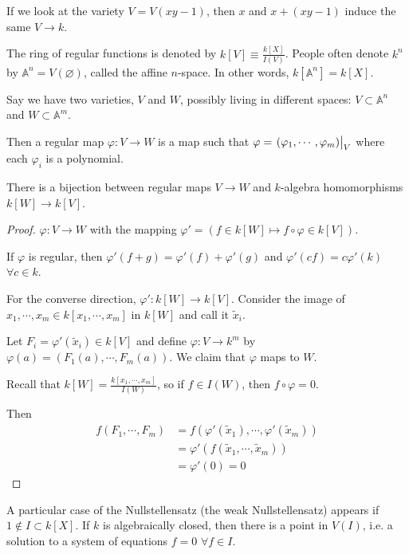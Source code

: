 \documentclass[a4paper,twoside,master.tex]{subfiles}
\begin{document}
If we look at the variety $ V = V(xy-1) $, then $ x $ and $ x + (xy - 1) $ induce the same $ V \to k $.

The ring of regular functions is denoted by $ k[V] \equiv \frac{k[X]}{I(V)} $. People often denote $ k^n $ by $ \mathbb{A}^n = V(\varnothing) $, called the affine $ n $-space. In other words, $ k[\mathbb{A}^n] = k[X] $.

Say we have two varieties, $ V $ and $ W $, possibly living in different spaces: $ V \subset \mathbb{A}^n $ and $ W \subset \mathbb{A}^m $.

Then a regular map $ \varphi \colon V \to W $ is a map such that $ \varphi = \eval{(\varphi_1, \cdots, \varphi_m)}_{V} $ where each $ \varphi_i $ is a polynomial.

\begin{claim}
    There is a bijection between regular maps $ V \to W $ and $ k $-algebra homomorphisms $ k[W] \to k[V] $.
\end{claim}
\begin{proof}
    $ \varphi \colon V \to W $ with the mapping $ \varphi' = (f \in k[W] \mapsto f \circ \varphi \in k[V]) $.
    
    If $ \varphi $ is regular, then $ \varphi'(f+g) = \varphi'(f) + \varphi'(g) $ and $ \varphi'(cf) = c \varphi'(k) $ $ \forall c \in k $.

    For the converse direction, $ \varphi' \colon k[W] \to k[V] $. Consider the image of $ x_1, \cdots, x_m \in k[x_1, \cdots, x_m] $ in $ k[W] $ and call it $ \tilde{x}_i $.

    Let $ F_i = \varphi'(\tilde{x}_i) \in k[V] $ and define $ \varphi \colon V \to k^m $ by $ \varphi(a) = (F_1(a), \cdots, F_m(a)) $. We claim that $ \varphi $ maps to $ W $. 

    Recall that $ k[W] = \frac{k[x_1, \cdots, x_m]}{I(W)} $, so if $ f \in I(W) $, then $ f \circ \varphi = 0 $.

    Then
    \begin{align}
        f(F_1, \cdots, F_m) &= f(\varphi'(\tilde{x}_1), \cdots, \varphi'(\tilde{x}_m)) \\
                            &= \varphi'(f(\tilde{x}_1, \cdots, \tilde{x}_m)) \\
                            &= \varphi'(0) = 0
    \end{align}
\end{proof}

A particular case of the Nullstellensatz (the weak Nullstellensatz) appears if $ 1 \not\in I \subset k[X] $. If $ k $ is algebraically closed, then there is a point in $ V(I) $, i.e. a solution to a system of equations $ f = 0 $ $ \forall f \in I $.
\end{document}
